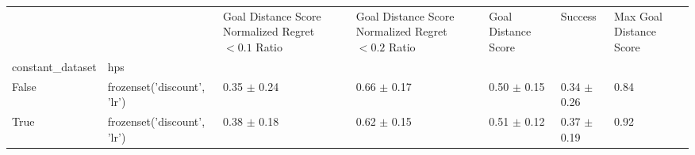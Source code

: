 \begin{tabular}{lllllll}
\toprule
 &  & Goal Distance Score Normalized Regret $< 0.1$ Ratio & Goal Distance Score Normalized Regret $< 0.2$ Ratio & Goal Distance Score & Success & Max Goal Distance Score \\
constant_dataset & hps &  &  &  &  &  \\
\midrule
False & frozenset({'discount', 'lr'}) & 0.35 $\pm$ 0.24 & 0.66 $\pm$ 0.17 & 0.50 $\pm$ 0.15 & 0.34 $\pm$ 0.26 & 0.84 \\
\cline{1-7}
True & frozenset({'discount', 'lr'}) & 0.38 $\pm$ 0.18 & 0.62 $\pm$ 0.15 & 0.51 $\pm$ 0.12 & 0.37 $\pm$ 0.19 & 0.92 \\
\cline{1-7}
\bottomrule
\end{tabular}
